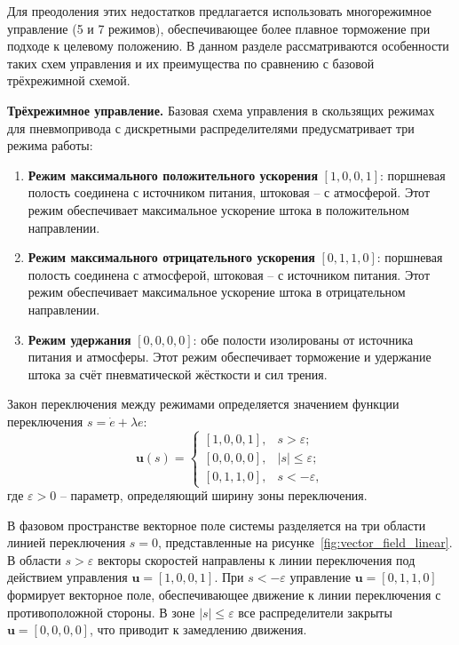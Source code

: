 Для преодоления этих недостатков предлагается использовать многорежимное управление (5 и 7 режимов), обеспечивающее
более плавное торможение при подходе к целевому положению. В данном разделе рассматриваются особенности
таких схем управления и их преимущества по сравнению с базовой трёхрежимной схемой.

\textbf{Трёхрежимное управление.}
Базовая схема управления в скользящих режимах для пневмопривода с дискретными распределителями предусматривает три режима работы:
\begin{enumerate}
	\item \textbf{Режим максимального положительного ускорения} $[1,0,0,1]$: поршневая полость соединена с источником питания, штоковая -- с атмосферой. Этот режим обеспечивает максимальное ускорение штока в положительном направлении.
	\item \textbf{Режим максимального отрицательного ускорения} $[0,1,1,0]$: поршневая полость соединена с атмосферой, штоковая -- с источником питания. Этот режим обеспечивает максимальное ускорение штока в отрицательном направлении.
	\item \textbf{Режим удержания} $[0,0,0,0]$: обе полости изолированы от источника питания и атмосферы. Этот режим обеспечивает торможение и удержание штока за счёт пневматической жёсткости и сил трения.
\end{enumerate}

Закон переключения между режимами определяется значением функции переключения $s = \dot{e} + \lambda e$:
\begin{equation}
	\mathbf{u}(s) = \begin{cases}
		[1,0,0,1], & s > \varepsilon;      \\
		[0,0,0,0], & |s| \leq \varepsilon; \\
		[0,1,1,0], & s < -\varepsilon,
	\end{cases}
\end{equation}
где $\varepsilon > 0$ -- параметр, определяющий ширину зоны переключения.

В фазовом пространстве векторное поле системы разделяется на три области линией переключения $s = 0$, представленные на рисунке~\ref{fig:vector_field_linear}.
В области $s > \varepsilon$ векторы скоростей направлены к линии переключения под действием управления $\mathbf{u} = [1,0,0,1]$.
При $s < -\varepsilon$ управление $\mathbf{u} = [0,1,1,0]$ формирует векторное поле, обеспечивающее движение к линии
переключения с противоположной стороны. В зоне $|s| \leq \varepsilon$ все распределители закрыты $\mathbf{u} = [0,0,0,0]$, что приводит к замедлению движения.

